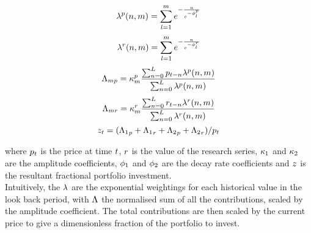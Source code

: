 \documentclass{article}
\begin{document}
\begin{equation}
\lambda^{p}(n,m) = \sum_{l = 1}^{m} e^{- \frac{ n}{e^{-\phi_l^p}}}
\end{equation}
\begin{equation}
\lambda^{r}(n,m) = \sum_{l = 1}^{m} e^{- \frac{ n}{e^{-\phi_l^r}}}
\end{equation}
\begin{equation}
{\Lambda}_{m p} = \kappa_{m}^{p} \frac{\sum_{n=0}^{L} p_{t - n} \lambda^{p}(n, m)}{\sum_{n = 0}^{L} \lambda^{p}(n, m)} \\
\end{equation}
\begin{equation}
\Lambda_{m  r} = \kappa_{m}^{r} \frac{\sum_{n=0}^{L} r_{t - n} \lambda^{r}(n, m)}{\sum_{n = 0}^{L} \lambda^{r}(n, m)} \\
\end{equation}
\begin{equation}
z_{t} = ({\Lambda_{1}}_{p} + {\Lambda_{1}}_{r} + {\Lambda_{2}}_{p} + {\Lambda_{2}}_{r})/{p}_{t} \\
\end{equation}
\hspace{200mm}

\noindent where $p_t$ is the price at time $t$, $r$ is the value of the research series, $\kappa_{1}$ and $\kappa_{2}$ are the amplitude coefficients, $\phi_{1}$ and $\phi_{2}$ are the decay rate coefficients and $z$ is the resultant fractional portfolio investment.\\
Intuitively, the $\lambda$ are the exponential weightings for each historical value in the look back period, with $\Lambda$ the normalised sum of all the contributions, scaled by the amplitude coefficient. The total contributions are then scaled by the current price to give a dimensionless fraction of the portfolio to invest.
\hspace{200mm}
\hspace{200mm}

\keyterms
\furtherlinks
\end{document}
